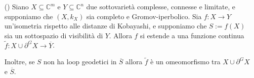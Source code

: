 \begin{thm}
    (\cite[Theorem 1.5]{CMS}) Siano $X\subseteq\mathbb{C}^m$ e $Y\subseteq\mathbb{C}^n$ due sottovarietà complesse, connesse e limitate, e supponiamo che $(X,k_X)$ sia completo e Gromov-iperbolico. Sia $f:X\longrightarrow Y$ un'isometria rispetto alle distanze di Kobayashi, e supponiamo che $S:=f(X)$ sia un sottospazio di visibilità di $Y$. Allora $f$ si estende a una funzione continua $\tilde{f}:X\cup\partial^GX\longrightarrow\overline{Y}$.

    Inoltre, se $S$ non ha loop geodetici in $\overline{S}$ allora $\tilde{f}$ è un omeomorfismo tra $X\cup\partial^GX$ e $\overline{S}$.
\end{thm}